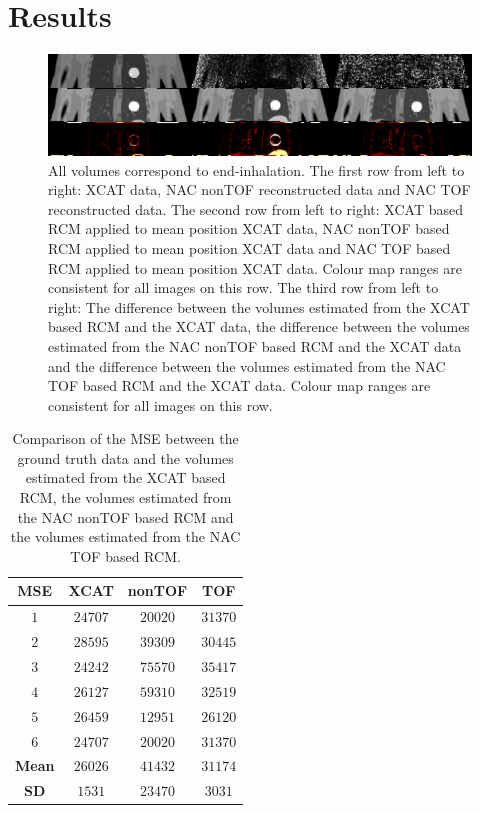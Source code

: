 \documentclass{IEEEtran}
\begin{document}
\section{Results}
\begin{figure}
    \centering
    \includegraphics[width=0.8\linewidth]{figures/output.png}
    \caption{All volumes correspond to end-inhalation. The first row from left to right: XCAT data, NAC nonTOF reconstructed data and NAC TOF reconstructed data. The second row from left to right: XCAT based RCM applied to mean position XCAT data, NAC nonTOF based RCM applied to mean position XCAT data and NAC TOF based RCM applied to mean position XCAT data. Colour map ranges are consistent for all images on this row. The third row from left to right: The difference between the volumes estimated from the XCAT based RCM and the XCAT data, the difference between the volumes estimated from the NAC nonTOF based RCM and the XCAT data and the difference between the volumes estimated from the NAC TOF based RCM and the XCAT data. Colour map ranges are consistent for all images on this row.}
    \label{fig:output}
\end{figure}

\begin{table}
    \centering
    \small
        \caption{Comparison of the MSE between the ground truth data and the volumes estimated from the XCAT based RCM, the volumes estimated from the NAC nonTOF based RCM and the volumes estimated from the NAC TOF based RCM.}
    \begin{tabular}{||c|ccc||}
    \hline
        \textbf{MSE}    & \textbf{XCAT} & \textbf{nonTOF}   & \textbf{TOF}  \\
    \hline
        \textbf{$1$}    & $24707$       & $20020$           & $31370$       \\
        \textbf{$2$}    & $28595$       & $39309$           & $30445$       \\
        \textbf{$3$}    & $24242$       & $75570$           & $35417$       \\
        \textbf{$4$}    & $26127$       & $59310$           & $32519$       \\
        \textbf{$5$}    & $26459$       & $12951$           & $26120$       \\
        \textbf{$6$}    & $24707$       & $20020$           & $31370$       \\
    \hline
        \textbf{Mean}   & $26026$       & $41432$           & $31174$       \\
    \hline
        \textbf{SD}     & $1531$        & $23470$           & $3031$        \\
    \hline
    \end{tabular}
    \label{tab:mse}
\end{table}
\end{document}
